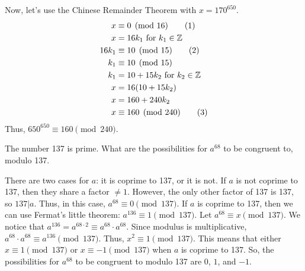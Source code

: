 \documentclass{article}
\newcommand\tagit{\addtocounter{equation}{1}\tag{\theequation}}
\begin{document}
\begin{solution}{}{}
    Now, let's use the Chinese Remainder Theorem with $x=170^{650}$.
    \begin{align*}
        x&\equiv 0\pmod{16} \tagit \\
        x&=16k_1 \text{ for } k_1\in\mathbb{Z} \\
        16k_1 &\equiv 10 \pmod{15} \tagit \\
        k_1 &\equiv 10 \pmod{15} \\
        k_1 &= 10+15k_2 \text{ for } k_2\in\mathbb{Z}\\
        x&=16(10+15k_2) \\
        x &= 160+240k_2 \\
        x &\equiv 160 \pmod{240} \tagit
    \end{align*}
    Thus, $650^{650} \equiv 160 \pmod{240}$.
\end{solution}

\begin{problem}{}{}
    The number 137 is prime. What are the possibilities for $a^{68}$ to be congruent to, modulo 137.
\end{problem}
\begin{solution}{}{}
    There are two cases for $a$: it is coprime to 137, or it is not. If $a$ is not coprime to 137, then they share a factor $\neq1$. However, the only other factor of 137 is 137, so $137|a$. Thus, in this case, $a^{68}\equiv0\pmod{137}$. If $a$ is coprime to 137, then we can use Fermat's little theorem: $a^{136}\equiv1\pmod{137}$. Let $a^{68}\equiv{x}\pmod{137}$. We notice that $a^{136}=a^{68\cdot2}\equiv a^{68}\cdot a^{68}$. Since modulus is multiplicative, $a^{68}\cdot a^{68}\equiv a^{136}\pmod{137}$. Thus, $x^2\equiv1\pmod{137}$. This means that either $x\equiv1\pmod{137}$ or $x\equiv-1\pmod{137}$ when $a$ is coprime to 137. So, the possibilities for $a^{68}$ to be congruent to modulo 137 are $0$, $1$, and $-1$.
\end{solution}
\end{document}
